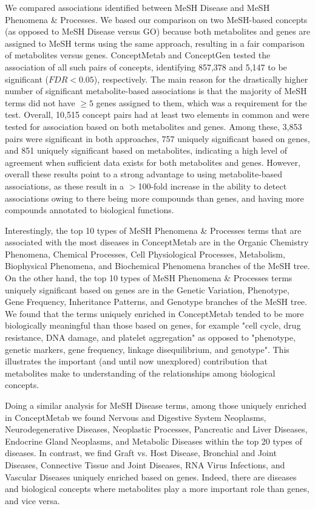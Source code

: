 We compared associations identified between MeSH Disease and MeSH Phenomena \& Processes. We based our comparison on two MeSH-based concepts (as opposed to MeSH Disease versus GO) because both metabolites and genes are assigned to MeSH terms using the same approach, resulting in a fair comparison of metabolites versus genes. ConceptMetab and ConceptGen tested the association of all such pairs of concepts, identifying 857,378 and 5,147 to be significant ($FDR < 0.05$), respectively. The main reason for the drastically higher number of significant metabolite-based associations is that the majority of MeSH terms did not have $\geq 5$ genes assigned to them, which was a requirement for the test. Overall, 10,515 concept pairs had at least two elements in common and were tested for association based on both metabolites and genes. Among these, 3,853 pairs were significant in both approaches, 757 uniquely significant based on genes, and 851 uniquely significant based on metabolites, indicating a high level of agreement when sufficient data exists for both metabolites and genes. However, overall these results point to a strong advantage to using metabolite-based associations, as these result in a $>$100-fold increase in the ability to detect associations owing to there being more compounds than genes, and having more compounds annotated to biological functions.

Interestingly, the top 10 types of MeSH Phenomena \& Processes terms that are associated with the most diseases in ConceptMetab are in the Organic Chemistry Phenomena, Chemical Processes, Cell Physiological Processes, Metabolism, Biophysical Phenomena, and Biochemical Phenomena branches of the MeSH tree. On the other hand, the top 10 types of MeSH Phenomena \& Processes terms uniquely significant based on genes are in the Genetic Variation, Phenotype, Gene Frequency, Inheritance Patterns, and Genotype branches of the MeSH tree. We found that the terms uniquely enriched in ConceptMetab tended to be more biologically meaningful than those based on genes, for example "cell cycle, drug resistance, DNA damage, and platelet aggregation" as opposed to "phenotype, genetic markers, gene frequency, linkage disequilibrium, and genotype". This illustrates the important (and until now unexplored) contribution that metabolites make to understanding of the relationships among biological concepts.

Doing a similar analysis for MeSH Disease terms, among those uniquely enriched in ConceptMetab we found Nervous and Digestive System Neoplasms, Neurodegenerative Diseases, Neoplastic Processes, Pancreatic and Liver Diseases, Endocrine Gland Neoplasms, and Metabolic Diseases within the top 20 types of diseases. In contrast, we find Graft vs. Host Disease, Bronchial and Joint Diseases, Connective Tissue and Joint Diseases, RNA Virus Infections, and Vascular Diseases uniquely enriched based on genes. Indeed, there are diseases and biological concepts where metabolites play a more important role than genes, and vice versa.

